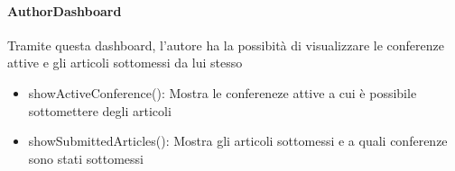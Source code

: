 \paragraph{AuthorDashboard}
Tramite questa dashboard, l'autore ha la possibità di visualizzare le conferenze attive e gli articoli sottomessi da lui stesso\\
\begin{itemize}
\item showActiveConference(): Mostra le confereneze attive a cui è possibile sottomettere degli articoli\\
\item showSubmittedArticles(): Mostra gli articoli sottomessi e a quali conferenze sono stati sottomessi\\
\end{itemize}

